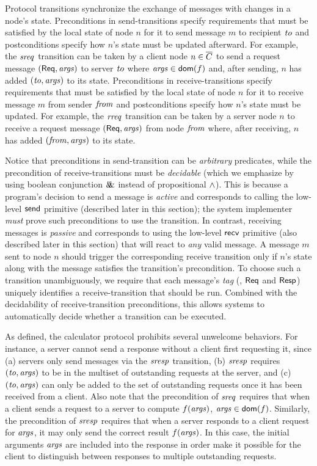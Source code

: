 Protocol transitions synchronize the exchange of messages with changes in a
node's state.
%
Preconditions in send-transitions specify requirements that must be
satisfied by the local state of node $n$ for it to send message $m$ to
recipient $\mathit{to}$ and postconditions specify how $n$'s state must be updated
afterward.
%
For example, the $\mathit{sreq}$ transition can be taken by a client
node $n \in \overline{C}$ to send a request message $(\mathsf{Req}, \mathit{args})$ to
server $\mathit{to}$ where $\mathit{args} \in \mathsf{dom}(f)$ and, after sending, $n$ has
added $(\mathit{to}, \mathit{args})$ to its state.
%
Preconditions in receive-transitions specify requirements that must be
satisfied by the local state of node $n$ for it to receive message $m$
from sender $\mathit{from}$ and postconditions specify how $n$'s state must be
updated.
%
For example, the $\mathit{rreq}$ transition can be taken by a server node
$n$ to receive a request message $(\mathsf{Req}, \mathit{args})$ from node $\mathit{from}$
where, after receiving, $n$ has added $(\mathit{from}, \mathit{args})$ to its state.
%


Notice that preconditions in send-transition can be \emph{arbitrary}
predicates, while the precondition of receive-transitions must be
\emph{decidable} (which we emphasize by using boolean conjunction $\&\!\!\!\&$
instead of propositional $\wedge$).
%
This is because a program's decision to send a message is
\emph{active} and corresponds to calling the low-level $\mathsf{send}$
primitive (described later in this section); the system implementer
\emph{must} prove such preconditions to use the transition.
%
In contrast, receiving messages is \emph{passive} and corresponds to
using the low-level $\mathsf{recv}{}$ primitive (also described later in this
section) that will react to \emph{any} valid message.
%
A message $m$ sent to node $n$ should trigger the corresponding receive
transition only if $n$'s state along with the message satisfies the
transition's precondition.
%
To choose such a transition unambiguously, we require that each
message's \emph{tag} (\eg, $\mathsf{Req}$ and $\mathsf{Resp}$) uniquely identifies a
receive-transition that should be run. Combined with the decidability
of receive-transition preconditions, this allows \disel systems to
automatically decide whether a transition can be executed.

As defined, the calculator protocol prohibits several unwelcome
behaviors.
%
For instance, a server cannot send a response without a client first
requesting it, since (a) servers only send messages via the
$\mathit{sresp}$ transition, (b) $\mathit{sresp}$ requires
$(\mathit{to}, \mathit{args})$ to be in the multiset of outstanding requests at the
server, and (c) $(\mathit{to}, \mathit{args})$ can only be added to the set of
outstanding requests once it has been received from a client.
%
Also note that the precondition of $\mathit{sreq}$ requires that when a
client sends a request to a server to compute $f(\mathit{args})$, $\mathit{args} \in \mathsf{dom}(f)$.
%
Similarly, the precondition of $\mathit{sresp}$ requires that when a server
responds to a client request for $\mathit{args}$, it may only send the correct
result $f(\mathit{args})$. In this case, the initial arguments $\mathit{args}$ are
included into the response in order make it possible for the client to
distinguish between responses to multiple outstanding requests.

